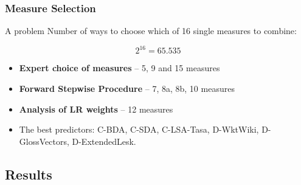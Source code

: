 \documentclass{beamer}
\begin{document}
\begin{frame}
\frametitle{Measure Selection}

\begin{block}{A problem}
 Number of ways to choose which of 16 single measures to combine:

$$ 2^{16}=65.535$$
 
\end{block}


\begin{itemize}
 
\item \textbf{Expert choice of measures} -- 5, 9 and 15 measures
\item \textbf{Forward Stepwise Procedure} -- 7, 8a, 8b, 10 measures 
\item \textbf{Analysis of LR weights} -- 12 measures

\pause

\item The \alert{best predictors}: C-BDA, C-SDA, C-LSA-Tasa, D-WktWiki, D-GlossVectors,  D-ExtendedLesk.


\end{itemize}
\end{frame}
  


\subsection{Results}

\end{document}
